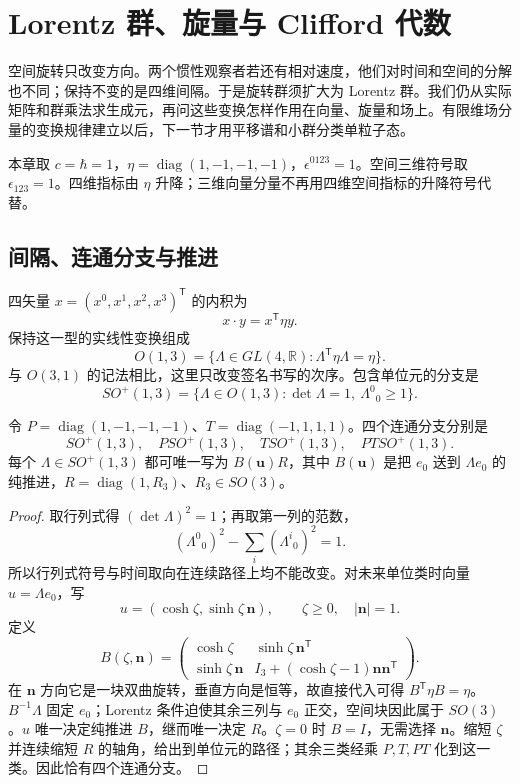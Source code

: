 \chapter{Lorentz 群、旋量与 Clifford 代数}
\label{chap:lorentz-fields}

空间旋转只改变方向。两个惯性观察者若还有相对速度，他们对时间和空间的分解也不同；保持不变的是四维间隔。于是旋转群须扩大为 Lorentz 群。我们仍从实际矩阵和群乘法求生成元，再问这些变换怎样作用在向量、旋量和场上。有限维场分量的变换规律建立以后，下一节才用平移谱和小群分类单粒子态。

本章取 $c=\hbar=1$，$\eta=\operatorname{diag}(1,-1,-1,-1)$，$\epsilon^{0123}=1$。空间三维符号取 $\epsilon_{123}=1$。四维指标由 $\eta$ 升降；三维向量分量不再用四维空间指标的升降符号代替。

\section{间隔、连通分支与推进}

\begin{definition}
四矢量 $x=(x^0,x^1,x^2,x^3)^{\mathsf T}$ 的内积为
\[
 x\cdot y=x^{\mathsf T}\eta y.
\]
保持这一型的实线性变换组成
\[
 O(1,3)=\{\Lambda\in GL(4,\mathbb R):\Lambda^{\mathsf T}\eta\Lambda=\eta\}.
\]
与 $O(3,1)$ 的记法相比，这里只改变签名书写的次序。包含单位元的分支是
\[
 SO^+(1,3)=\{\Lambda\in O(1,3):\det\Lambda=1,\ \Lambda^0{}_0\ge1\}.
\]
\end{definition}

\begin{proposition}
令 $P=\operatorname{diag}(1,-1,-1,-1)$、$T=\operatorname{diag}(-1,1,1,1)$。四个连通分支分别是
\begin{equation}
 SO^+(1,3),\quad P SO^+(1,3),\quad T SO^+(1,3),\quad PT SO^+(1,3).
 \label{eq:lorentz-components}
\end{equation}
每个 $\Lambda\in SO^+(1,3)$ 都可唯一写为 $B(\mathbf u)R$，其中 $B(\mathbf u)$ 是把 $e_0$ 送到 $\Lambda e_0$ 的纯推进，$R=\operatorname{diag}(1,R_3)$、$R_3\in SO(3)$。
\end{proposition}
\begin{proof}
取行列式得 $(\det\Lambda)^2=1$；再取第一列的范数，
\[
 (\Lambda^0{}_0)^2-\sum_i(\Lambda^i{}_0)^2=1.
\]
所以行列式符号与时间取向在连续路径上均不能改变。对未来单位类时向量 $u=\Lambda e_0$，写
\[
 u=(\cosh\zeta,\sinh\zeta\,\mathbf n),\qquad \zeta\ge0,\quad |\mathbf n|=1.
\]
定义
\[
 B(\zeta,\mathbf n)=
 \begin{pmatrix}
 \cosh\zeta&\sinh\zeta\,\mathbf n^{\mathsf T}\\
 \sinh\zeta\,\mathbf n&I_3+(\cosh\zeta-1)\mathbf n\mathbf n^{\mathsf T}
 \end{pmatrix}.
\]
在 $\mathbf n$ 方向它是一块双曲旋转，垂直方向是恒等，故直接代入可得 $B^{\mathsf T}\eta B=\eta$。$B^{-1}\Lambda$ 固定 $e_0$；Lorentz 条件迫使其余三列与 $e_0$ 正交，空间块因此属于 $SO(3)$。$u$ 唯一决定纯推进 $B$，继而唯一决定 $R$。$\zeta=0$ 时 $B=I$，无需选择 $\mathbf n$。缩短 $\zeta$ 并连续缩短 $R$ 的轴角，给出到单位元的路径；其余三类经乘 $P,T,PT$ 化到这一类。因此恰有四个连通分支。
\end{proof}

